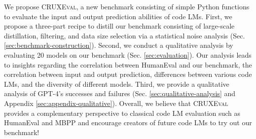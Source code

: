 \documentclass{article} %
\newcommand{\benchmark}{\textsc{CRUXEval}\xspace}
\begin{document}
We propose \benchmark, a new benchmark consisting of simple Python functions to evaluate the input and output prediction abilities of code LMs. First, we propose a three-part recipe to distill our benchmark consisting of large-scale distillation, filtering, and data size selection via a statistical noise analysis (Sec. \ref{sec:benchmark-construction}). Second, we conduct a qualitative analysis by evaluating 20 models on our benchmark (Sec. \ref{sec:evaluation}). Our analysis leads to insights regarding the correlation between HumanEval and our benchmark, the correlation between input and output prediction, differences between various code LMs, and the diversity of different models. Third, we provide a qualitative analysis of GPT-4's successes and failures (Sec. \ref{sec:qualitative-analysis} and Appendix \ref{sec:appendix-qualitative}). Overall, we believe that \benchmark provides a complementary perspective to classical code LM evaluation such as HumanEval and MBPP and encourage creators of future code LMs to try out our benchmark!



% 


\newpage
\appendix
\onecolumn






\end{document}
